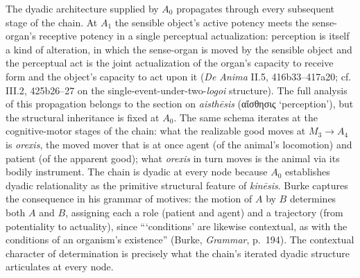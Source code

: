 \documentclass{article}
\newcommand{\gk}[1]{{\greekfont #1}}
\begin{document}
The dyadic architecture supplied by $A_0$ propagates through every subsequent stage of the chain. At $A_1$ the sensible object's active potency meets the sense-organ's receptive potency in a single perceptual actualization: perception is itself a kind of alteration, in which the sense-organ is moved by the sensible object and the perceptual act is the joint actualization of the organ's capacity to receive form and the object's capacity to act upon it (\textit{De Anima} II.5, 416b33--417a20; cf. III.2, 425b26--27 on the single-event-under-two-\textit{logoi} structure). The full analysis of this propagation belongs to the section on \textit{aisthēsis} (\gk{αἴσθησις} `perception'), but the structural inheritance is fixed at $A_0$. The same schema iterates at the cognitive-motor stages of the chain: what the realizable good moves at $M_3 \rightarrow A_4$ is \textit{orexis}, the moved mover that is at once agent (of the animal's locomotion) and patient (of the apparent good); what \textit{orexis} in turn moves is the animal via its bodily instrument. The chain is dyadic at every node because $A_0$ establishes dyadic relationality as the primitive structural feature of \textit{kinēsis}. Burke captures the consequence in his grammar of motives: the motion of $A$ by $B$ determines both $A$ and $B$, assigning each a role (patient and agent) and a trajectory (from potentiality to actuality), since ```conditions' are likewise contextual, as with the conditions of an organism's existence'' (Burke, \textit{Grammar}, p.~194). The contextual character of determination is precisely what the chain's iterated dyadic structure articulates at every node.
\end{document}
